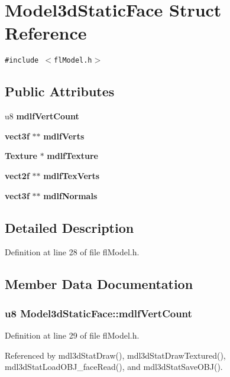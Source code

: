 \section{Model3d\-Static\-Face Struct Reference}
\label{structModel3dStaticFace}
{\tt \#include $<$fl\-Model.h$>$}

\subsection*{Public Attributes}
\begin{CompactItemize}
\item 
u8 {\bf mdlf\-Vert\-Count}
\item 
{\bf vect3f} $\ast$$\ast$ {\bf mdlf\-Verts}
\item 
{\bf Texture} $\ast$ {\bf mdlf\-Texture}
\item 
{\bf vect2f} $\ast$$\ast$ {\bf mdlf\-Tex\-Verts}
\item 
{\bf vect3f} $\ast$$\ast$ {\bf mdlf\-Normals}
\end{CompactItemize}


\subsection{Detailed Description}




Definition at line 28 of file fl\-Model.h.

\subsection{Member Data Documentation}
\subsubsection{\setlength{\rightskip}{0pt plus 5cm}u8 {\bf Model3d\-Static\-Face::mdlf\-Vert\-Count}}\label{structModel3dStaticFace_f0af24f25adc6c21fdfe896c433585ed}




Definition at line 29 of file fl\-Model.h.

Referenced by mdl3d\-Stat\-Draw(), mdl3d\-Stat\-Draw\-Textured(), mdl3d\-Stat\-Load\-OBJ\_\-face\-Read(), and mdl3d\-Stat\-Save\-OBJ().
